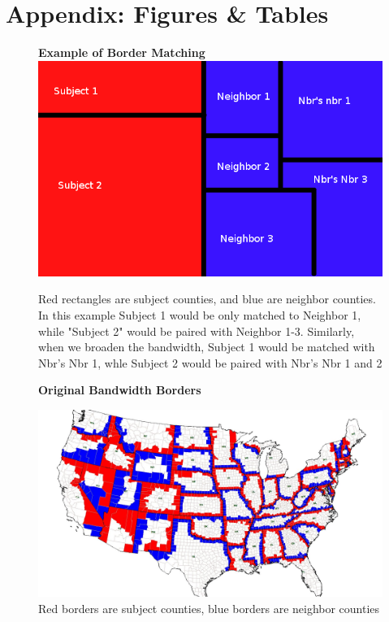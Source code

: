 \documentclass[12pt,a4paper]{article}
\begin{document}
\section{Appendix: Figures \& Tables}

\begin{figure}[h]\label{rb}
    \centering
    \textbf{Example of Border Matching}
    \includegraphics[scale = 0.5]{../analysis/output/borders_temp}
    \caption{Red rectangles are subject counties, and blue are neighbor counties. In this example Subject 1 would be only matched to Neighbor 1, while "Subject 2" would be paired with Neighbor 1-3. Similarly, when we broaden the bandwidth, Subject 1 would be matched with Nbr's Nbr 1, whle Subject 2 would be paired with Nbr's Nbr 1 and 2}
\end{figure}

\begin{figure}[h]\label{eb}
    \centering
    \textbf{Original Bandwidth Borders}\par\medskip
    \includegraphics[scale = 0.20]{../analysis/output/rb_picture}
    \caption{Red borders are subject counties, blue borders are neighbor counties}
\end{figure}
\end{document}
